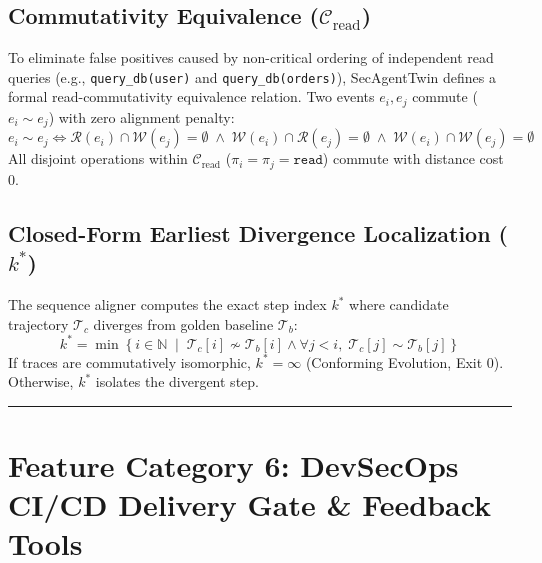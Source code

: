 \documentclass[10pt,a4paper]{article}
\begin{document}
\subsection{Commutativity Equivalence ($\mathcal{C}_{\text{read}}$)}
To eliminate false positives caused by non-critical ordering of independent read queries (e.g., \texttt{query\_db(user)} and \texttt{query\_db(orders)}), SecAgentTwin defines a formal read-commutativity equivalence relation. Two events $e_i, e_j$ commute ($e_i \sim e_j$) with zero alignment penalty:
\begin{equation}
    e_i \sim e_j \iff \mathcal{R}(e_i) \cap \mathcal{W}(e_j) = \emptyset \;\land\; \mathcal{W}(e_i) \cap \mathcal{R}(e_j) = \emptyset \;\land\; \mathcal{W}(e_i) \cap \mathcal{W}(e_j) = \emptyset
\end{equation}
All disjoint operations within $\mathcal{C}_{\text{read}}$ ($\pi_i = \pi_j = \texttt{read}$) commute with distance cost $0$.

\subsection{Closed-Form Earliest Divergence Localization ($k^*$)}
The sequence aligner computes the exact step index $k^*$ where candidate trajectory $\mathcal{T}_c$ diverges from golden baseline $\mathcal{T}_b$:
\begin{equation}
    k^* = \min \left\{ i \in \mathbb{N} \;\middle|\; \mathcal{T}_c[i] \not\sim \mathcal{T}_b[i] \land \forall j < i, \; \mathcal{T}_c[j] \sim \mathcal{T}_b[j] \right\}
\end{equation}
If traces are commutatively isomorphic, $k^* = \infty$ (Conforming Evolution, Exit 0). Otherwise, $k^*$ isolates the divergent step.

\vspace{0.4em}
\hrule
\vspace{0.6em}

\section{Feature Category 6: DevSecOps CI/CD Delivery Gate \& Feedback Tools}
\end{document}

